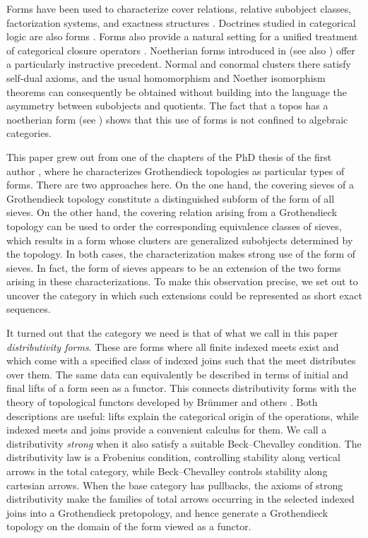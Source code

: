 \documentclass[12pt,oneside,reqno]{amsart}
\theoremstyle{definition}
\theoremstyle{remark}
\begin{document}
Forms have been used to characterize cover relations,
relative subobject classes, factorization systems, and exactness
structures \cite{JanelidzeWeighillI,JanelidzeWeighillII,
JanelidzeWeighillIII}. Doctrines studied in categorical logic are also forms
\cite{LawvereAdjointness,Jacobs,JohnstoneElephant}.
Forms also provide a natural setting for a
unified treatment of categorical closure operators
\cite{DuckertsAntoineGranJanelidze}. Noetherian forms introduced in \cite{GoswamiJanelidze} 
(see also \cite{JanelidzeSubgroups,VanNiekerkBiproducts,
VanNiekerkConstruction,JanelidzeVanNiekerk}) offer a  
particularly instructive precedent. Normal and conormal clusters there
satisfy self-dual axioms, and the usual homomorphism and Noether
isomorphism theorems can consequently be obtained without building into
the language the asymmetry between subobjects and quotients. The fact that a topos has
a noetherian form (see \cite{JanelidzeVanNiekerk}) shows that this use of forms is not confined
to algebraic categories.

This paper grew out from one of the chapters of the PhD thesis of the first author
\cite{FergusonThesis}, where he characterizes Grothendieck topologies as
particular types of forms. There are two approaches here. On the one
hand, the covering sieves of a Grothendieck topology constitute a distinguished
subform of the form of all sieves. On the other hand, the covering
relation arising from a Grothendieck topology \cite[Chapter~III, Section~2]{MacLaneMoerdijk} can be used to order the
corresponding equivalence classes of sieves, which results in a form whose clusters are generalized subobjects determined by the topology. In both
cases, the characterization makes strong use of the form of sieves. In
fact, the form of sieves appears to be an extension of the two forms
arising in these characterizations. To make this observation precise,
we set out to uncover the category in which such extensions could be represented as short exact sequences. 

It turned out that the category we need is that of what we call in this paper
\emph{distributivity forms}. These are forms where all finite indexed meets exist and which come with a specified class of indexed joins such that the meet
distributes over them.  The same data can equivalently be
described in terms of initial and final lifts of a form seen as a  functor.
This connects distributivity forms with the theory of topological functors developed by Br\"ummer and others
\cite{Brummer,HerrlichTopological,BrummerHoffmann}. Both
descriptions are useful: lifts explain the categorical origin of the operations,
while indexed meets and joins provide a convenient calculus for them.
We call a distributivity \emph{strong} when it
also satisfy a suitable Beck--Chevalley condition. The distributivity law is a
Frobenius condition, controlling stability along vertical arrows in the
total category, while Beck--Chevalley controls stability along cartesian
arrows.  When the base category has pullbacks, the axioms of strong
distributivity make the families of total arrows occurring in the
selected indexed joins into a Grothendieck pretopology, and hence
generate a Grothendieck topology on the domain of the form viewed as a functor.
\end{document}

